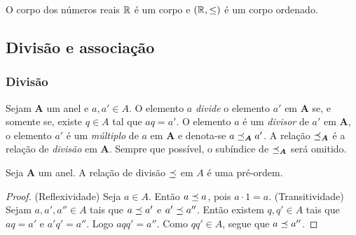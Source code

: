\begin{exercise}
O corpo dos números reais $\mathbb{R}$ é um corpo e $(\mathbb{R},\leq)$ é um corpo ordenado.
\end{exercise}


\subsection{Divisão e associação}

\subsubsection{Divisão}


\begin{definition}
Sejam $\bm A$ um anel e $a,a' \in A$. O elemento $a$ \emph{divide} o elemento $a'$ em $\bm A$ se, e somente se, existe $q \in A$ tal que $aq=a'$. O elemento $a$ é um \emph{divisor} de $a'$ em $\bm A$, o elemento $a'$ é um \emph{múltiplo} de $a$ em $\bm A$ e denota-se $a \preceq_{\bm A} a'$. A relação $\preceq_{\bm A}$ é a relação de \emph{divisão} em $\bm A$. Sempre que possível, o subíndice de $\preceq_{\bm A}$ será omitido.
\end{definition}

\begin{proposition}
Seja $\bm A$ um anel. A relação de divisão $\preceq$ em $A$ é uma pré-ordem.
\end{proposition}
\begin{proof}
(Reflexividade) Seja $a \in A$. Então $a \preceq a$, pois $a \cdot 1 = a$. (Transitividade) Sejam $a,a',a'' \in A$ tais que $a \preceq a'$ e $a' \preceq a''$. Então existem $q,q' \in A$ tais que $aq=a'$ e $a'q'=a''$. Logo $aqq'=a''$. Como $qq' \in A$, segue que $a \preceq a''$.
\end{proof}

